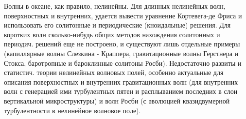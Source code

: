 \documentclass[10pt]{article}
\begin{document}
Волны в океане, как правило, нелинейны. Для длинных нелинейных волн, поверхностных и внутренних, удается вывести уравнение Кортевега-де Фриса и использовать его солитонные и периодические (кноидальные) решения. Для коротких волн сколько-нибудь общих методов нахождения солитонных и периодич. решений еще не построено, и существуют лишь отдельные примеры (капиллярные волны Слезкина - Краппера, гравитационные волны Герстнера и Стокса, баротропные и бароклинные солитоны Росби). Недостаточно развиты и статистич. теории нелинейных волновых полей, особенно актуальные для описания поверхностных и внутренних гравитационных волн (для внутренних волн с генерацией ими турбулентных пятен и расплыванием последних в слои вертикальноӥ микроструктуры) и волн Росби (с әволюцией квазидвумерной турбулентности в нелинейное волновое поле).
\end{document}
